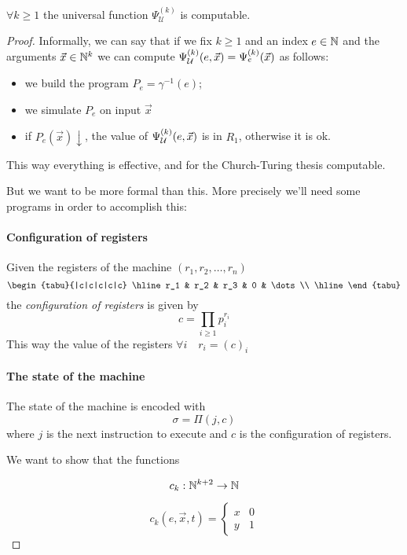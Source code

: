 \begin{theorem}
  $\forall k \geq 1$ the universal function $\Psi_{\mathcal{U}}^{(k)}$
  is computable.

  \begin{proof}
    Informally, we can say that if we fix $k \geq 1$ and an index
    $e \in \mathbb{N}$ and the arguments $\vec{x} \in \mathbb{N}^k$ we can compute
    $\Psi_{\mathcal{U}}^{(k)} (e, \vec{x}) = \Psi_e^{(k)} (\vec{x})$ as follows:
    \begin{itemize}
    \item we build the program $P_e = \gamma^{-1}(e)$;
    \item we simulate $P_e$ on input $\vec{x}$
    \item if $P_e(\vec{x})\downarrow$, the value of $\Psi_{\mathcal{U}}^{(k)} (e, \vec{x})$ is in
      $R_1$, otherwise it is ok.
    \end{itemize}
    This way everything is effective, and for the Church-Turing
    thesis computable.

    But we want to be more formal than this. More precisely we'll need
    some programs in order to accomplish this:

    \paragraph{Configuration of registers}
    Given the registers of the machine $(r_1, r_2, \dots, r_n)$
    \[
      \begin{tabu}{|c|c|c|c|c}
        \hline
        r_1 & r_2 & r_3 & 0 & \dots \\ \hline
      \end{tabu}
    \]
    the \textit{configuration of registers} is given by
    \[ c = \prod_{i \geq 1} p_i^{r_i} \]
    This way the value of the registers $\forall i \quad r_i = (c)_i$

    \paragraph{The state of the machine}
    The state of the machine is encoded with \[ \sigma = \Pi(j, c) \]
    where $j$ is the next instruction to execute and $c$ is the
    configuration of registers.

    We want to show that the functions

    \[
      c_k : \mathbb{N}^{k+2} \rightarrow \mathbb{N}
    \]

    \[
      c_k(e, \vec{x}, t) = \begin{cases}
        x & 0 \\
        y & 1
      \end{cases}
    \]


\end{proof}
\end{theorem}
